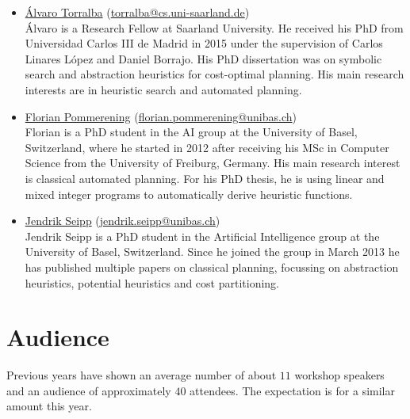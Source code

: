 \documentclass[10pt]{article}
\begin{document}
\begin{itemize}
\item \href{https://fai.cs.uni-saarland.de/torralba/}{\'{A}lvaro
  Torralba}
  (\href{mailto:torralba@cs.uni-saarland.de}{torralba@cs.uni-saarland.de})\\ \'{A}lvaro
  is a Research Fellow at Saarland University. He received his PhD
  from Universidad Carlos III de Madrid in 2015 under the supervision
  of Carlos Linares L\'{o}pez and Daniel Borrajo. His PhD dissertation
  was on symbolic search and abstraction heuristics for cost-optimal
  planning. His main research interests are in heuristic search and
  automated planning.

\item \href{http://ai.cs.unibas.ch/people/pommeren}{Florian Pommerening}
  (\href{mailto:florian.pommerening@unibas.ch}{florian.pommerening@unibas.ch})\\
  Florian is a PhD student in the AI group at the University of Basel,
  Switzerland, where he started in 2012 after receiving his MSc in
  Computer Science from the University of Freiburg, Germany. His main
  research interest is classical automated planning. For his PhD
  thesis, he is using linear and mixed integer programs to
  automatically derive heuristic functions.

\item \href{http://ai.cs.unibas.ch/people/seipp}{Jendrik Seipp}
  (\href{mailto:jendrik.seipp@unibas.ch}{jendrik.seipp@unibas.ch})\\
  Jendrik Seipp is a PhD student in the Artificial Intelligence group
  at the University of Basel, Switzerland. Since he joined the group in
  March 2013 he has published multiple papers on classical planning,
  focussing on abstraction heuristics, potential heuristics and cost
  partitioning.


\end{itemize}

\section*{Audience}
Previous years have shown an average number of about $11$ workshop
speakers and an audience of approximately $40$ attendees. The
expectation is for a similar amount this year.
\end{document}
